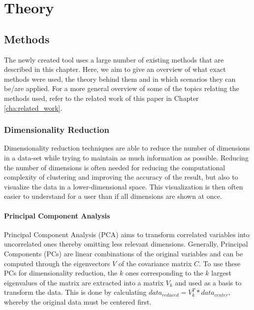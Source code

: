 \documentclass[
	a4paper,
	english,
	twoside,
	openright,               
	11pt                            
	]{report}
\begin{document}
\part{Theory}
\chapter{Methods}\label{cha:methods}
The newly created tool uses a large number of existing methods that are described in this chapter. Here, we aim to give an overview of what exact methods were used, the theory behind them and in which scenarios they can be/are applied. For a more general overview of some of the topics relating the methods used, refer to the related work of this paper in Chapter \ref{cha:related_work}.

\section{Dimensionality Reduction}\label{sec:dim_reduction}
Dimensionality reduction techniques are able to reduce the number of dimensions in a data-set while trying to maintain as much information as possible. Reducing the number of dimensions is often needed for reducing the computational complexity of clustering and improving the accuracy of the result, but also to visualize the data in a lower-dimensional space. This visualization is then often easier to understand for a user than if all dimensions are shown at once.

\subsection{Principal Component Analysis}
 Principal Component Analysis (PCA) \cite{pca} aims to transform correlated variables into uncorrelated ones thereby omitting less relevant dimensions. Generally, Principal Components (PCs) are linear combinations of the original variables and can be computed through the eigenvectors $V$ of the covariance matrix $C$. To use these PCs for dimensionality reduction, the $k$ ones corresponding to the $k$ largest eigenvalues of the matrix are extracted into a matrix $V_k$ and used as a basis to transform the data. This is done by calculating $data_{reduced}=V_k^T*data_{center}$, whereby the original data must be centered first.
\end{document}
